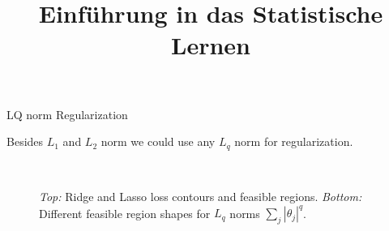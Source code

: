 



\newcommand{\titlefigure}{figure_man/lasso_ridge_hat.png}
\newcommand{\learninggoals}{
  \item Know LQ norm regularization
  \item Understand that L0 norm realization simply counts the number of non-zero parameters
}

\title{Einführung in das Statistische Lernen}
\date{}




\begin{vbframe}{LQ norm Regularization}

Besides $L_1$ and $L_2$ norm we could use any $L_q$ norm for regularization.

\begin{figure}
  \\
\caption{\textit{Top:} Ridge and Lasso loss contours and feasible regions.
  \textit{Bottom:} Different feasible region shapes for $L_q$ norms $\sum_j |\theta_j|^q$.}
\end{figure}

\end{vbframe}


